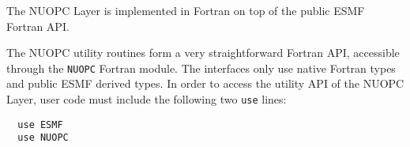 
The NUOPC Layer is implemented in Fortran on top of the public ESMF Fortran API.

The NUOPC utility routines form a very straightforward Fortran API, accessible through the {\tt NUOPC} Fortran module. The interfaces only use native Fortran types and public ESMF derived types. In order to access the utility API of the NUOPC Layer, user code must include the following two {\tt use} lines:

\begin{verbatim}
  use ESMF
  use NUOPC
\end{verbatim}
